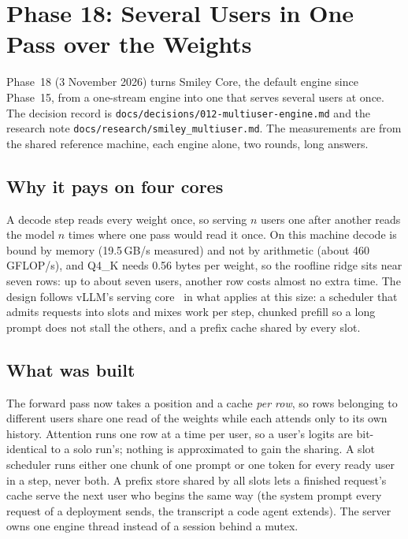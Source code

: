\section{Phase 18: Several Users in One Pass over the Weights}
\label{sec:phase18}

Phase~18 (3 November 2026) turns Smiley Core, the default engine since Phase~15, from a one-stream engine into one that serves several users at
once. The decision record is \texttt{docs/decisions/012-multiuser-engine.md} and the research note \texttt{docs/research/smiley\_multiuser.md}. The
measurements are from the shared reference machine, each engine alone, two rounds, long answers.

\subsection{Why it pays on four cores}

A decode step reads every weight once, so serving $n$ users one after another reads the model $n$ times where one pass would read it once. On this
machine decode is bound by memory (19.5\,GB/s measured) and not by arithmetic (about 460\,GFLOP/s), and Q4\_K needs 0.56 bytes per weight, so the
roofline ridge sits near seven rows: up to about seven users, another row costs almost no extra time. The design follows vLLM's serving
core~\cite{kwon2023pagedattention} in what applies at this size: a scheduler that admits requests into slots and mixes work per step, chunked prefill
so a long prompt does not stall the others, and a prefix cache shared by every slot.

\subsection{What was built}

The forward pass now takes a position and a cache \emph{per row}, so rows belonging to different users share one read of the weights while each
attends only to its own history. Attention runs one row at a time per user, so a user's logits are bit-identical to a solo run's; nothing is
approximated to gain the sharing. A slot scheduler runs either one chunk of one prompt or one token for every ready user in a step, never both. A
prefix store shared by all slots lets a finished request's cache serve the next user who begins the same way (the system prompt every request of a
deployment sends, the transcript a code agent extends). The server owns one engine thread instead of a session behind a mutex.

